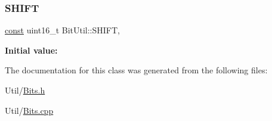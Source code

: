 \subsubsection{\texorpdfstring{S\+H\+I\+FT}{SHIFT}}
{\footnotesize\ttfamily \mbox{\hyperlink{ZlibCrc32_8h_a2c212835823e3c54a8ab6d95c652660e}{const}} uint16\+\_\+t Bit\+Util\+::\+S\+H\+I\+FT\hspace{0.3cm}{\ttfamily [static]}, {\ttfamily [private]}}

{\bfseries Initial value\+:}
\begin{DoxyCode}
\DoxyCodeLine{= \{}
\DoxyCodeLine{\}}
\end{DoxyCode}


The documentation for this class was generated from the following files\+:\begin{DoxyCompactItemize}
\item 
Util/\mbox{\hyperlink{Bits_8h}{Bits.\+h}}\item 
Util/\mbox{\hyperlink{Bits_8cpp}{Bits.\+cpp}}\end{DoxyCompactItemize}
